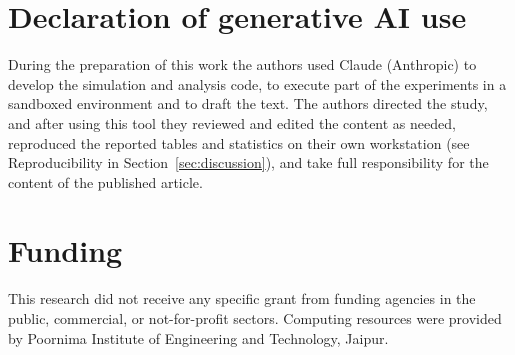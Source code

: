 \documentclass[preprint,12pt]{elsarticle}
\begin{document}
\section*{Declaration of generative AI use}
During the preparation of this work the authors used Claude (Anthropic) to develop the simulation and analysis code, to execute part of the experiments in a sandboxed environment and to draft the text. The authors directed the study, and after using this tool they reviewed and edited the content as needed, reproduced the reported tables and statistics on their own workstation (see Reproducibility in Section~\ref{sec:discussion}), and take full responsibility for the content of the published article.

\section*{Funding}
This research did not receive any specific grant from funding agencies in the public, commercial, or not-for-profit sectors. Computing resources were provided by Poornima Institute of Engineering and Technology, Jaipur.



\end{document}
